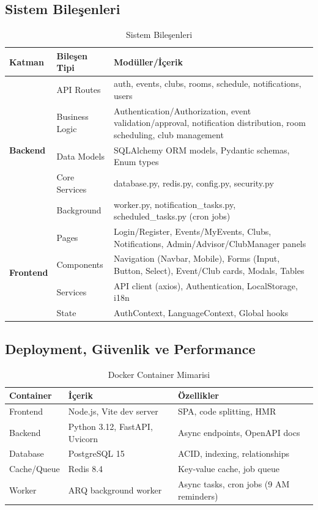 \documentclass[a4paper,12pt]{report}
\begin{document}
\subsection{Sistem Bileşenleri}

\begin{table}[h]
\centering
\scriptsize
\begin{tabular}{|l|l|p{8.5cm}|}
\hline
\textbf{Katman} & \textbf{Bileşen Tipi} & \textbf{Modüller/İçerik} \\ \hline
\multirow{5}{*}{\textbf{Backend}}
& API Routes & auth, events, clubs, rooms, schedule, notifications, users \\ \cline{2-3}
& Business Logic & Authentication/Authorization, event validation/approval, notification distribution, room scheduling, club management \\ \cline{2-3}
& Data Models & SQLAlchemy ORM models, Pydantic schemas, Enum types \\ \cline{2-3}
& Core Services & database.py, redis.py, config.py, security.py \\ \cline{2-3}
& Background & worker.py, notification\_tasks.py, scheduled\_tasks.py (cron jobs) \\ \hline
\multirow{4}{*}{\textbf{Frontend}}
& Pages & Login/Register, Events/MyEvents, Clubs, Notifications, Admin/Advisor/ClubManager panels \\ \cline{2-3}
& Components & Navigation (Navbar, Mobile), Forms (Input, Button, Select), Event/Club cards, Modals, Tables \\ \cline{2-3}
& Services & API client (axios), Authentication, LocalStorage, i18n \\ \cline{2-3}
& State & AuthContext, LanguageContext, Global hooks \\ \hline
\end{tabular}
\caption{Sistem Bileşenleri}
\end{table}

\subsection{Deployment, Güvenlik ve Performance}

\begin{table}[h]
\centering
\scriptsize
\begin{tabular}{|l|p{5.5cm}|p{5.5cm}|}
\hline
\textbf{Container} & \textbf{İçerik} & \textbf{Özellikler} \\ \hline
Frontend & Node.js, Vite dev server & SPA, code splitting, HMR \\ \hline
Backend & Python 3.12, FastAPI, Uvicorn & Async endpoints, OpenAPI docs \\ \hline
Database & PostgreSQL 15 & ACID, indexing, relationships \\ \hline
Cache/Queue & Redis 8.4 & Key-value cache, job queue \\ \hline
Worker & ARQ background worker & Async tasks, cron jobs (9 AM reminders) \\ \hline
\end{tabular}
\caption{Docker Container Mimarisi}
\end{table}
\end{document}
